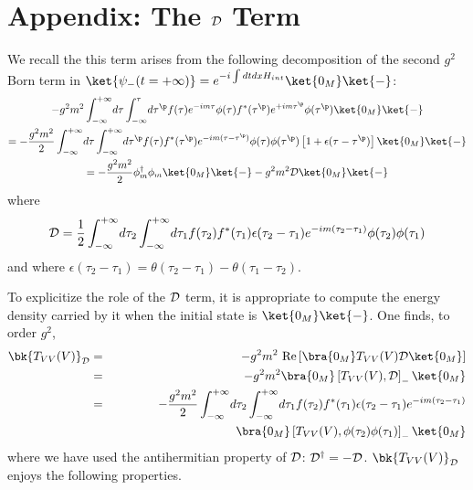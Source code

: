 \documentclass[12pt]{article}
\begin{document}
\section{Appendix: The $\cal{D}$ Term}\label{app}


We recall the this term arises from the following
decomposition of the second $g^2$ Born term in
$\ket{\psi_-(t=+\infty)}=e^{-i \int dt dx H_{int}}\ket{0_M} \ket{-}$:
\begin{multline}
- g^2 m^2
\int_{-\infty}^{+\infty}\!
d\tau
\int_{-\infty}^{\tau}\!
d\tau^\p f(\tau) e^{-im\tau}  \phi(\tau)
  f^*(\tau^\p) e^{+im\tau^\p}  \phi(\tau^\p)\ket{0_M}
\ket{-}\\
= - {g^2 m^2 \over 2}
\int_{-\infty}^{+\infty}\!
d\tau
\int_{-\infty}^{+\infty}\!
d\tau^\p f(\tau)f^*(\tau^\p)
e^{-im(\tau-\tau^\p)} \phi(\tau) \phi(\tau^\p)
\left[ 1 + \epsilon(\tau - \tau^\p)\right]
\ket{0_M}
\ket{-} \\
= -{g^2 m^2\over 2}
\phi_m^\dagger \phi_m \ket{0_M}\ket{-}
-  g^2 m^2
{\cal D}  \ket{0_M}\ket{-}
\label{stateA}
\end{multline}
where
\begin{equation}
{\cal D} = {1 \over 2}
\int_{-\infty}^{+\infty}\!  d\tau_2
\int_{-\infty}^{+\infty}\!
  d \tau_1 f(\tau_2) f^*(\tau_1)
\epsilon(\tau_2 - \tau_1) e^{-i m( \tau_2- \tau_1)}
\phi(\tau_2) \phi(\tau_1)
\label{calDA}
\end{equation}
and where $\epsilon(\tau_2 - \tau_1) = \theta(\tau_2 - \tau_1) -
\theta(\tau_1 - \tau_2 )$.

To explicitize the role of the ${\cal D}$ term, it is appropriate
to compute the energy density carried by it when the initial state is
$\ket{0_M}\ket{-}$.
One finds, to  order $g^2$,
\begin{eqnarray}
\bk{T_{VV}(V)}_{{\cal D}}&=&  -g^2 m^2
\mbox{ Re}\left[ \bra{0_M} T_{VV}(V) {\cal D} \ket{0_M}\right]
\nonumber \\
&=&  -g^2 m^2
 \bra{0_M} \left[ T_{VV}(V),{\cal D}\right]_- \ket{0_M}
\nonumber \\
&=& - {g^2 m^2 \over 2}
\int_{-\infty}^{+\infty} \! d\tau_2
\int_{-\infty}^{+\infty} \! d \tau_1
f(\tau_2)  f^*(\tau_1)
\epsilon(\tau_2 - \tau_1)
 e^{-i m( \tau_2- \tau_1)}
\nonumber \\
& &\quad \quad \quad \quad \quad \quad \quad \quad \quad \quad
\bra{0_M} \left[T_{VV}(V), \phi(\tau_2)\phi(\tau_1) \right]_- \ket{0_M}
\label{Comm}
\end{eqnarray}
where we have used the antihermitian property of ${\cal D}$:
${\cal D}^\dagger =
-{\cal D}$.
$\bk{T_{VV}(V)}_{{\cal D}}$ enjoys the following properties.
\end{document}

